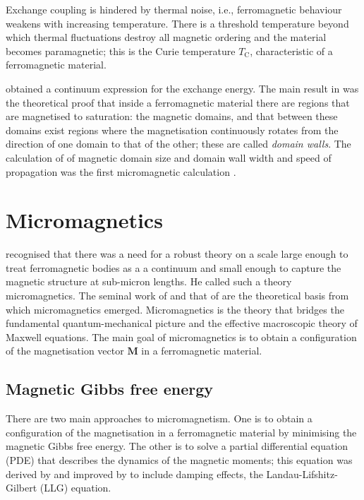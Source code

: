 Exchange coupling is hindered by thermal noise, i.e., ferromagnetic behaviour weakens with increasing temperature. There is a threshold temperature beyond which thermal fluctuations destroy all magnetic ordering and the material becomes paramagnetic; this is the Curie temperature $T_\text{C}$, characteristic of a ferromagnetic material.\par

\citet{Landau1935} obtained a continuum expression for the exchange energy. The main result in \citet{Landau1935} was the theoretical proof that inside a ferromagnetic material there are regions that are magnetised to saturation: the magnetic domains, and that between these domains exist regions where the magnetisation continuously rotates from the direction of one domain to that of the other; these are called \textit{domain walls}. The calculation of \citet{Landau1935} of magnetic domain size and domain wall width and speed of propagation was the first micromagnetic calculation \citep{Brown}.

\section{Micromagnetics}\label{mmsection}
\citet{Brown} recognised that there was a need for a robust theory on a scale large enough to treat ferromagnetic bodies as a a continuum and small enough to capture the magnetic structure at sub-micron lengths. He called such a theory micromagnetics. The seminal work of \citet{Landau1935} and that of \citet{Brown} are the theoretical basis from which micromagnetics emerged. Micromagnetics is the theory that bridges the fundamental quantum-mechanical picture and the effective macroscopic theory of Maxwell equations. The main goal of micromagnetics is to obtain a configuration of the magnetisation vector $\boldsymbol{M}$ in a ferromagnetic material.\par

\subsection{Magnetic Gibbs free energy}
There are two main approaches to micromagnetism. One is to obtain a configuration of the magnetisation in a ferromagnetic material by minimising the magnetic Gibbs free energy. The other is to solve a partial differential equation (PDE) that describes the dynamics of the magnetic moments; this equation was derived by \citet{Landau1935} and improved by \citet{Gilbert2004} to include damping effects, the Landau-Lifshitz-Gilbert (LLG) equation.\par

